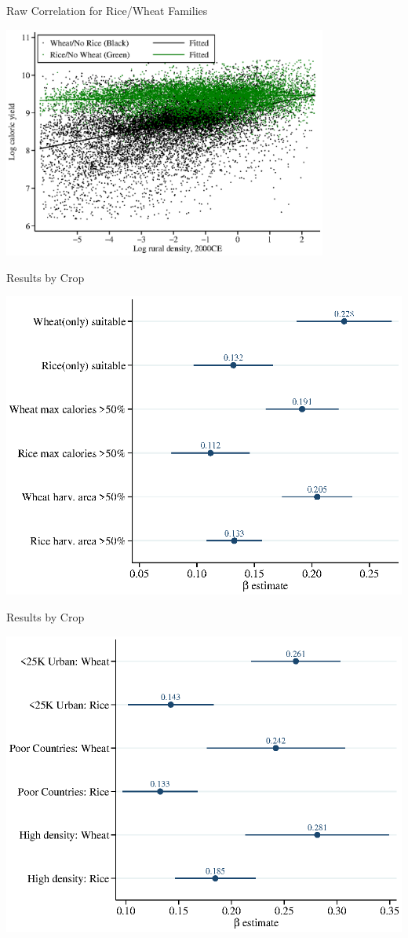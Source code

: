 \documentclass[10pt, xcolor=dvipsnames]{beamer}
\begin{document}
\begin{frame}{Raw Correlation for Rice/Wheat Families}
\begin{center}
\includegraphics[width=0.8\textwidth]{fig_beta_crop.eps}
\end{center}
\end{frame}

\begin{frame}{Results by Crop}\label{crop}
\begin{center}
\includegraphics[width=.8\textwidth]{fig_coef_crop_base.eps}
\end{center}
\hfill \hyperlink{cropreg}{}
\end{frame}

\begin{frame}{Results by Crop}
\begin{center}
\includegraphics[width=.8\textwidth]{fig_coef_crop_sub_base.eps}
\end{center}
\end{frame}
\end{document}
